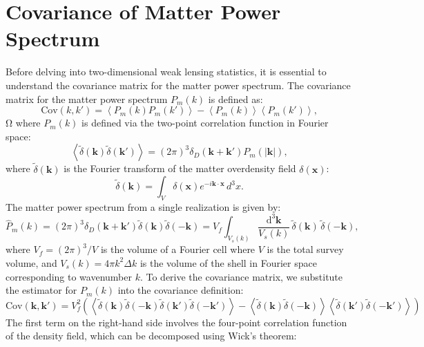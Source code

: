 \section{Covariance of Matter Power Spectrum}
Before delving into two-dimensional weak lensing statistics, it is essential to understand the covariance matrix for the matter power spectrum.
The covariance matrix for the matter power spectrum \( P_m(k) \) is defined as:
\begin{equation}
    \mathrm{Cov}(k, k') = \left\langle P_m(k) P_m(k') \right\rangle - \left\langle P_m(k) \right\rangle \left\langle P_m(k') \right\rangle,
\end{equation}Ω
where \( P_m(k) \) is defined via the two-point correlation function in Fourier space:
\begin{equation}
    \left\langle \tilde{\delta}(\mathbf{k}) \tilde{\delta}(\mathbf{k'}) \right\rangle = (2\pi)^3 \delta_D(\mathbf{k} + \mathbf{k'}) P_m(|\mathbf{k}|),
\end{equation}
where \( \tilde{\delta}(\mathbf{k}) \) is the Fourier transform of the matter overdensity field \( \delta(\mathbf{x}) \):
\begin{equation}
    \tilde{\delta}(\mathbf{k}) = \int_V \delta(\mathbf{x}) e^{-i \mathbf{k} \cdot \mathbf{x}} \, d^3 x.
\end{equation}
The matter power spectrum from a single realization is given by:
\begin{equation}
    \hat{P}_m(k) = (2\pi)^3 \delta_D(\mathbf{k} + \mathbf{k'}) \tilde{\delta}(\mathbf{k}) \tilde{\delta}(-\mathbf{k}) = V_f \int_{V_s(k)} \frac{\mathrm{d}^3 \mathbf{k}}{V_s(k)} \, \tilde{\delta}(\mathbf{k}) \, \tilde{\delta}(-\mathbf{k}),
\end{equation}
where $V_f = (2\pi)^3 / V$ is the volume of a Fourier cell where $V$ is the total survey volume, and $V_s(k) = 4\pi k^2 \Delta k$ is the volume of the shell in Fourier space corresponding to wavenumber \( k \).
To derive the covariance matrix, we substitute the estimator for \( P_m(k) \) into the covariance definition:
\begin{equation}
    \mathrm{Cov}(\mathbf{k}, \mathbf{k'}) = V_f^2 \left( \left\langle \tilde{\delta}(\mathbf{k}) \tilde{\delta}(-\mathbf{k}) \tilde{\delta}(\mathbf{k'}) \tilde{\delta}(-\mathbf{k'}) \right\rangle - \left\langle \tilde{\delta}(\mathbf{k}) \tilde{\delta}(-\mathbf{k}) \right\rangle \left\langle \tilde{\delta}(\mathbf{k'}) \tilde{\delta}(-\mathbf{k'}) \right\rangle\right)
\end{equation}
The first term on the right-hand side involves the four-point correlation function of the density field, which can be decomposed using Wick's theorem:
